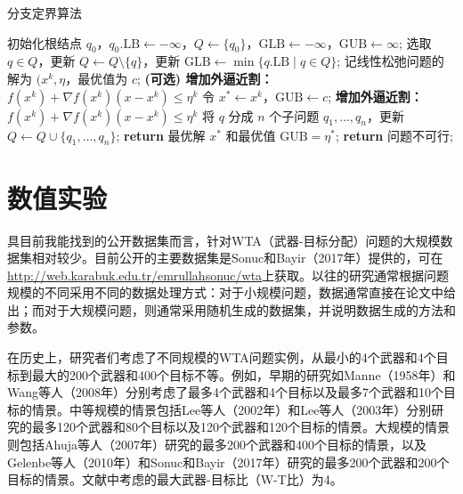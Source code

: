 \begin{algorithm}[!htbp]
    \small
    \caption{分支定界算法}\label{alg:branch_and_bound}
    \begin{algorithmic}[1]
        \State 初始化根结点 $q_0$，$q_0.\text{LB} \gets -\infty$，$Q \gets \{q_0\}$，$\text{GLB} \gets -\infty$，$\text{GUB} \gets \infty$;
            \State 选取 $q \in Q$，更新 $Q \gets Q \setminus \{q\}$，更新 $\text{GLB} \gets \min\{q.\text{LB} \mid q \in Q\}$;
                \State 记线性松弛问题的解为 $(x^k, \eta$，最优值为 $c$;
                    \State \textbf{(可选) 增加外逼近割：$f(x^k) + \nabla f(x^k) (x - x^k) \leq \eta^k$}
                \EndIf
                        \State 令 $x^* \gets x^k$，$\text{GUB} \gets c$;
                            \State \textbf{增加外逼近割：$f(x^k) + \nabla f(x^k) (x - x^k) \leq \eta^k$}
                        \EndIf
                    \Else
                        \State 将 $q$ 分成 $n$ 个子问题 $q_1, \ldots, q_n$，更新 $Q \gets Q \cup \{q_1, \ldots, q_n\}$;
                    \EndIf
                \EndIf
            \EndIf
        \EndWhile
            \State \textbf{return} 最优解 $x^*$ 和最优值 $\text{GUB} = \eta^*$;
        \Else
            \State \textbf{return} 问题不可行;
        \EndIf
        \EndProcedure
    \end{algorithmic}
\end{algorithm}

\section{数值实验}
具目前我能找到的公开数据集而言，针对WTA（武器-目标分配）问题的大规模数据集相对较少。目前公开的主要数据集是Sonuc和Bayir（2017年）提供的，可在\href{http://web.karabuk.edu.tr/emrullahsonuc/wta}{http://web.karabuk.edu.tr/emrullahsonuc/wta}上获取。以往的研究通常根据问题规模的不同采用不同的数据处理方式：对于小规模问题，数据通常直接在论文中给出；而对于大规模问题，则通常采用随机生成的数据集，并说明数据生成的方法和参数。

在历史上，研究者们考虑了不同规模的WTA问题实例，从最小的4个武器和4个目标到最大的200个武器和400个目标不等。例如，早期的研究如Manne（1958年）和Wang等人（2008年）分别考虑了最多4个武器和4个目标以及最多7个武器和10个目标的情景。中等规模的情景包括Lee等人（2002年）和Lee等人（2003年）分别研究的最多120个武器和80个目标以及120个武器和120个目标的情景。大规模的情景则包括Ahuja等人（2007年）研究的最多200个武器和400个目标的情景，以及Gelenbe等人（2010年）和Sonuc和Bayir（2017年）研究的最多200个武器和200个目标的情景。文献中考虑的最大武器-目标比（W-T比）为4。

